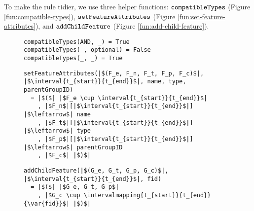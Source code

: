 To make the rule tidier, we use three helper functions: $\texttt{compatibleTypes}$ (Figure \vref{fun:compatible-types}), $\texttt{setFeatureAttributes}$ (Figure \vref{fun:set-feature-attributes}), and $\texttt{addChildFeature}$ (Figure \vref{fun:add-child-feature}). 

\begin{figure}[h]
  \begin{verbatim}
compatibleTypes(AND, _) = True
compatibleTypes(_, optional) = False
compatibleTypes(_, _) = True
  \end{verbatim}
  \caption{\label{fun:compatible-types}}
\end{figure}

\begin{figure}[h]
  \begin{verbatim}
setFeatureAttributes(|$(F_e, F_n, F_t, F_p, F_c)$|, |$\interval{t_{start}}{t_{end}}$|, name, type, parentGroupID)
  = |$($| |$F_e \cup \interval{t_{start}}{t_{end}}$|
    , |$F_n$|[|$\interval{t_{start}}{t_{end}}$|] |$\leftarrow$| name
    , |$F_t$|[|$\interval{t_{start}}{t_{end}}$|] |$\leftarrow$| type
    , |$F_p$|[|$\interval{t_{start}}{t_{end}}$|] |$\leftarrow$| parentGroupID
    , |$F_c$| |$)$|
     \end{verbatim}
  \caption{\label{fun:set-feature-attributes}}
\end{figure}

\begin{figure}[h]
  \begin{verbatim}
addChildFeature(|$(G_e, G_t, G_p, G_c)$|, |$\interval{t_{start}}{t_{end}}$|, fid)
  = |$($| |$G_e, G_t, G_p$|
    , |$G_c \cup \intervalmapping{t_{start}}{t_{end}}{\var{fid}}$| |$)$|
  \end{verbatim}
  \caption{\label{fun:add-child-feature}}
\end{figure}





\begin{figure}
  
  \caption{\label{rule:add-group}}
\end{figure}
